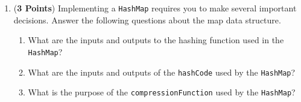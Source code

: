 \documentclass[12pt]{article}
\begin{document}
\begin{enumerate}
\begin{enumerate}
    \item ({\bf 3 Points}) Implementing a {\tt HashMap} requires you to make several important decisions. Answer the
    following questions about the map data structure.

    \begin{enumerate}
        \item What are the inputs and outputs to the hashing function used in the {\tt HashMap}?
        \item What are the inputs and outputs of the {\tt hashCode} used by the {\tt HashMap}?
        \item What is the purpose of the {\tt compressionFunction} used by the {\tt HashMap}?
    \end{enumerate}

\end{enumerate}









\end{enumerate}
\end{document}
